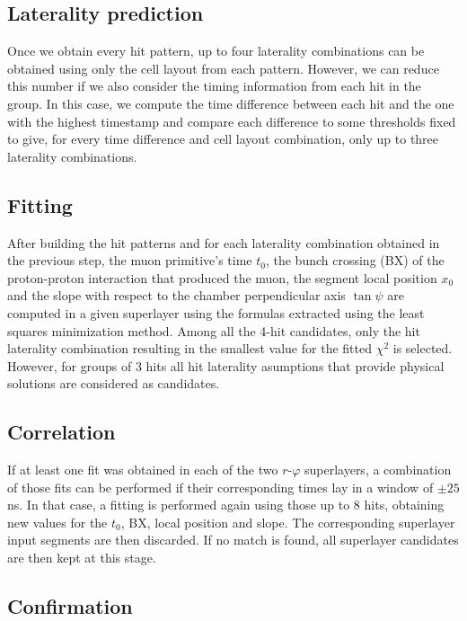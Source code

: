 \documentclass[../main.tex]{subfiles}
\begin{document}
\subsection{Laterality prediction}

Once we obtain every hit pattern, up to four laterality combinations can be obtained using only the cell layout from each pattern. However, we can reduce this number if we also consider the timing information from each hit in the group. In this case, we compute the time difference between each hit and the one with the highest timestamp and compare each difference to some thresholds fixed to give, for every time difference and cell layout combination, only up to three laterality combinations.

\subsection{Fitting}

After building the hit patterns and for each laterality combination obtained in the previous step, the muon primitive's time $t_0$, the bunch crossing (BX) of the proton-proton interaction that produced the muon, the segment local position $x_0$ and the slope with respect to the chamber perpendicular axis $\tan\psi$ are computed in a given superlayer using the formulas extracted using the least squares minimization method. Among all the 4-hit candidates, only the hit laterality combination resulting in the smallest value for the fitted $\chi^2$ is selected. However, for groups of 3 hits all hit laterality asumptions that provide physical solutions are considered as candidates.

\subsection{Correlation}

If at least one fit was obtained in each of the two $r$-$\varphi$ superlayers, a combination of those fits can be performed if their corresponding times lay in a window of $\pm 25$ ns. In that case, a fitting is performed again using those up to 8 hits, obtaining new values for the $t_0$, BX, local position and slope. The corresponding superlayer input segments are then discarded. If no match is found, all superlayer candidates are then kept at this stage.

\subsection{Confirmation}
\end{document}
